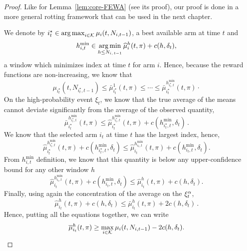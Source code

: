\begin{proof}
Like for Lemma~\ref{lem:core-FEWA} (see its proof), our proof is done in a more general rotting framework that can be used in the next chapter. 

We denote by $
i^\star_t \in \operatorname*{arg\,max}_{i\in \mathcal{K}}{\mu_i(t,N_{i,t-1})}
$, a best available arm at time $t$ and 
\[
h_{i,t}^{\min} \in \operatorname*{arg\,min}_{h\leq N_{i,\,t-1} }{\widehat{\mu}_i^h(t,\pi) + c(h,\delta_t)},
\]
a window which minimizes \RAWUCB index at time $t$ for arm $i$. Hence, because the reward functions are non-increasing, we know that 
\begin{equation*}
 \mu_{i^\star_t}(t, N_{i^\star_t,t-1}) \leq   \bar{\mu}_{i^\star_t}^1(t,\pi) \leq \cdots \leq  \bar{\mu}_{i^\star_t}^{h_{i^\star_t,t}^{\min}}(t,\pi)\cdot
\end{equation*}
On the high-probability event $\xi_t$, we know that the true average of the means cannot deviate significantly from the average of the observed quantity,
\begin{equation*}
\bar{\mu}_{i^\star_t}^{h_{i^\star_t,t}^{\min}}(t, \pi) \leq \hat{\mu}_{i^\star_t}^{h_{i^\star_t,t}^{\min}}(t,\pi) + c(h_{i^\star_t,t}^{\min},\delta_t)\,.
\end{equation*}
We know that the selected arm $i_t$ at time $t$ has the largest index, hence, 
\[
\hat{\mu}_{i^\star_t}^{h^{\min}_{i^\star_t,t}}(t, \pi) + c(h^{\min}_{i^\star_t,t},\delta_t) \leq \hat{\mu}_{i_t}^{h^{\min}_{i_t,t}}(t, \pi) + c(h^{\min}_{i_t,t},\delta_t).
\]
From $h_{i,t}^{\min}$ definition, we know that this quantity is below any upper-confidence bound for any other window $h$
\[
\hat{\mu}_{i_t}^{h^{\min}_{i_t,t}}(t, \pi) + c(h^{\min}_{i_t,t},\delta_t) \leq \hat{\mu}_{i_t}^{h}(t, \pi) + c(h,\delta_t).
\]
Finally, using again the concentration of the average on the $\xi^\alpha_t$, 
\[
\hat{\mu}_{i_t}^{h}(t, \pi) + c(h,\delta_t) \leq \bar{\mu}_{i_t}^{h}(t, \pi) + 2c(h,\delta_t)\,.
\]
Hence, putting all the equations together, we can write
\begin{equation*}
\overline{\mu}_{i_t}^{h}(t, \pi) \geq \max_{i \in \mathcal{K}} \mu_{i}(t,N_{i,t-1}) - 2 c(h, \delta_t).
\end{equation*}
\end{proof}